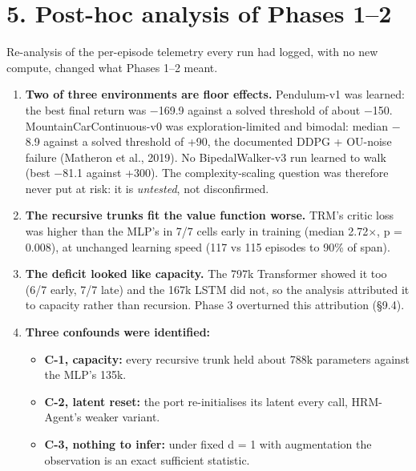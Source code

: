 \documentclass[11pt]{article}
\begin{document}
\medskip



\section*{5. Post-hoc analysis of Phases 1--2}



Re-analysis of the per-episode telemetry every run had logged, with no new compute, changed what Phases 1--2 meant.



\begin{enumerate}
\item \textbf{Two of three environments are floor effects.} Pendulum-v1 was learned: the best final return was $-$169.9 against a solved threshold of about $-$150. MountainCarContinuous-v0 was exploration-limited and bimodal: median $-$8.9 against a solved threshold of +90, the documented DDPG + OU-noise failure (Matheron et al., 2019). No BipedalWalker-v3 run learned to walk (best $-$81.1 against +300). The complexity-scaling question was therefore never put at risk: it is \emph{untested}, not disconfirmed.
\item \textbf{The recursive trunks fit the value function worse.} TRM's critic loss was higher than the MLP's in 7/7 cells early in training (median 2.72$\times$, p = 0.008), at unchanged learning speed (117 vs 115 episodes to 90\% of span).
\item \textbf{The deficit looked like capacity.} The 797k Transformer showed it too (6/7 early, 7/7 late) and the 167k LSTM did not, so the analysis attributed it to capacity rather than recursion. Phase 3 overturned this attribution (\S{}9.4).
\item \textbf{Three confounds were identified:}
\begin{itemize}
\item \textbf{C-1, capacity:} every recursive trunk held about 788k parameters against the MLP's 135k.
\item \textbf{C-2, latent reset:} the port re-initialises its latent every call, HRM-Agent's weaker variant.
\item \textbf{C-3, nothing to infer:} under fixed d = 1 with augmentation the observation is an exact sufficient statistic.
\end{itemize}
\end{enumerate}
\end{document}
